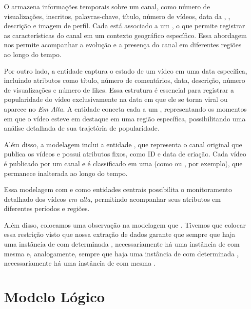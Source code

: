   O  armazena informações temporais sobre um canal, como número de visualizações, inscritos, palavras-chave, título, número de vídeos, data da , , descrição e imagem de perfil. Cada  está associado a um , o que permite registrar as características do canal em um contexto geográfico específico. Essa abordagem nos permite acompanhar a evolução e a presença do canal em diferentes regiões ao longo do tempo.

  Por outro lado, a entidade  captura o estado de um vídeo em uma data específica, incluindo atributos como título, número de comentários, data, descrição, número de visualizações e número de likes. Essa estrutura é essencial para registrar a popularidade do vídeo exclusivamente na data em que ele se torna viral ou aparece no \emph{Em Alta}. A entidade  conecta cada  a um , representando os momentos em que o vídeo esteve em destaque em uma região específica, possibilitando uma análise detalhada de sua trajetória de popularidade.

  Além disso, a modelagem inclui a entidade , que representa o canal original que publica os vídeos e possui atributos fixos, como ID e data de criação. Cada vídeo é publicado por um canal e é classificado em uma  (como  ou , por exemplo), que permanece inalterada ao longo do tempo.

  Essa modelagem com  e  como entidades centrais possibilita o monitoramento detalhado dos vídeos \emph{em alta}, permitindo acompanhar seus atributos em diferentes períodos e regiões.

  Além disso, colocamos uma observação na modelagem que . Tivemos que colocar essa restrição visto que nossa extração de dados garante que sempre que haja uma instância de  com determinada , necessariamente há uma instância de  com mesma  e, analogamente, sempre que haja uma instância de  com determinada , necessariamente há uma instância de  com mesma .


\newpage
\section{Modelo Lógico}

